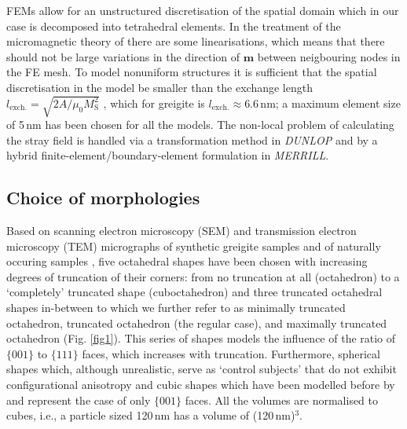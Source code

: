 \documentclass[review,authoryear]{elsarticle}
\newcommand{\nm}{\,\text{nm}}
\begin{document}
FEMs allow for an unstructured discretisation of the spatial domain which in our case is decomposed into tetrahedral elements. In the treatment of the micromagnetic theory of \citet{Brown} there are some linearisations, which means that there should not be large variations in the direction of $\boldsymbol{m}$ between neigbouring nodes in the FE mesh. To model nonuniform structures it is sufficient that the spatial discretisation in the model be smaller than the exchange length $l_\text{exch.} = \sqrt{2A/\mu_0M_\text{S}^2}$ \citep{Rave1998}, which for greigite is $l_\text{exch.} \approx 6.6\, \text{nm}$; a maximum element size of 5$\nm$ has been chosen for all the models. The non-local problem of calculating the stray field is handled via a transformation method \citep{Imhoff1990} in \textit{DUNLOP} and by a hybrid finite-element/boundary-element formulation \citep{Fredkin1990} in \textit{MERRILL}.\par

\subsection{Choice of morphologies}
Based on scanning electron microscopy (SEM) and transmission electron microscopy (TEM) micrographs of synthetic greigite samples \citep{Chang2008, Guowei2014} and of naturally occuring samples \citep{Snowball1997, Vasiliev2008}, five octahedral shapes have been chosen with increasing degrees of truncation of their corners: from no truncation at all (octahedron) to a `completely' truncated shape (cuboctahedron) and three truncated octahedral shapes in-between to which we further refer to as minimally truncated octahedron, truncated octahedron (the regular case), and maximally truncated octahedron (Fig. \ref{fig1}). This series of shapes models the influence of the ratio of $\{001\}$ to $\{111\}$ faces, which increases with truncation. Furthermore, spherical shapes which, although unrealistic, serve as `control subjects' that do not exhibit configurational anisotropy \citep{Williams2006} and cubic shapes which have been modelled before by \citet{Muxworthy2013} and represent the case of only $\{001\}$ faces. All the volumes are normalised to cubes, i.e., a particle sized 120$\nm$ has a volume of (120$\nm$)$^3$.\par
\end{document}
